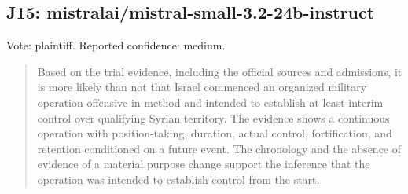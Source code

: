 \subsection{J15: mistralai/mistral-small-3.2-24b-instruct}

Vote: plaintiff.  Reported confidence: medium.

\begin{quote}
Based on the trial evidence, including the official sources and admissions, it is more likely than not that Israel commenced an organized military operation offensive in method and intended to establish at least interim control over qualifying Syrian territory. The evidence shows a continuous operation with position-taking, duration, actual control, fortification, and retention conditioned on a future event. The chronology and the absence of evidence of a material purpose change support the inference that the operation was intended to establish control from the start.
\end{quote}
